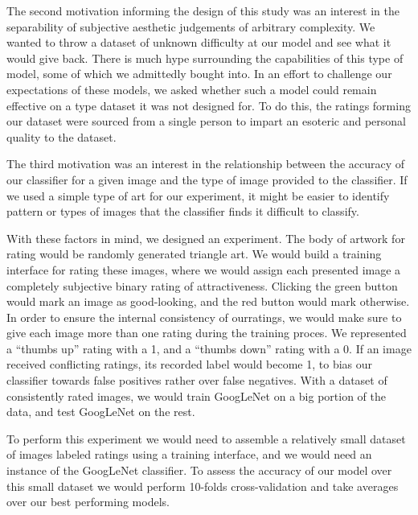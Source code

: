 \documentclass[midd]{thesis}
\begin{document}
The second motivation informing the design of this study was an interest in the separability of subjective aesthetic judgements of arbitrary complexity. We wanted to throw a dataset of unknown difficulty at our model and see what it would give back. There is much hype surrounding the capabilities of this type of model, some of which we admittedly bought into. In an effort to challenge our expectations of these models, we asked whether such a model could remain effective on a type dataset it was not designed for. To do this, the ratings forming our dataset were sourced from a single person to impart an esoteric and personal quality to the dataset.

The third motivation was an interest in the relationship between the accuracy of our classifier for a given image and the type of image provided to the classifier. If we used a simple type of art for our experiment, it might be easier to identify pattern or types of images that the classifier finds it difficult to classify.

With these factors in mind, we designed an experiment. The body of artwork for rating would be randomly generated triangle art. We would build a training interface for rating these images, where we would assign each presented image a completely subjective binary rating of attractiveness. Clicking the green button would mark an image as good-looking, and the red button would mark otherwise. In order to ensure the internal consistency of ourratings, we would make sure to give each image more than one rating during the training proces. We represented a ``thumbs up'' rating with a 1, and a ``thumbs down'' rating with a 0. If an image received conflicting ratings, its recorded label would become 1, to bias our classifier towards false positives rather over false negatives. With a dataset of consistently rated images, we would train GoogLeNet on a big portion of the data, and test GoogLeNet on the rest.

To perform this experiment we would need to assemble a relatively small dataset of images labeled ratings using a training interface, and we would need an instance of the GoogLeNet classifier. To assess the accuracy of our model over this small dataset we would perform 10-folds cross-validation and take averages over our best performing models.
\end{document}
